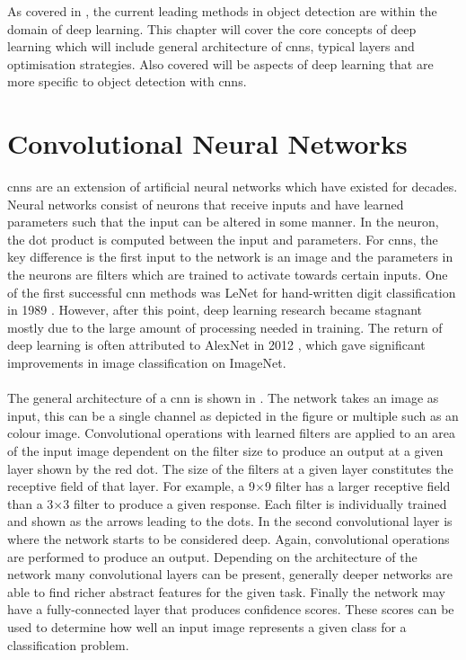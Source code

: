 As covered in , the current leading methods in object detection are within the domain of deep learning. This chapter will cover the core concepts of deep learning which will include general architecture of \glspl{cnn}, typical layers and optimisation strategies. Also covered will be aspects of deep learning that are more specific to object detection with \glspl{cnn}.

\section{Convolutional Neural Networks}
\glspl{cnn} are an extension of artificial neural networks which have existed for decades. Neural networks consist of neurons that receive inputs and have learned parameters such that the input can be altered in some manner. In the neuron, the dot product is computed between the input and parameters. For \glspl{cnn}, the key difference is the first input to the network is an image and the parameters in the neurons are filters which are trained to activate towards certain inputs. One of the first successful \gls{cnn} methods was LeNet for hand-written digit classification in 1989 \cite{lenet}. However, after this point, deep learning research became stagnant mostly due to the large amount of processing needed in training. The return of deep learning is often attributed to AlexNet in 2012 \cite{alexnet}, which gave significant improvements in image classification on ImageNet.
\\\\
The general architecture of a \gls{cnn} is shown in . The network takes an image as input, this can be a single channel as depicted in the figure or multiple such as an colour image. Convolutional operations with learned filters are applied to an area of the input image dependent on the filter size to produce an output at a given layer shown by the red dot. The size of the filters at a given layer constitutes the receptive field of that layer. For example, a 9$\times$9 filter has a larger receptive field than a 3$\times$3 filter to produce a given response. Each filter is individually trained and shown as the arrows leading to the dots. In the second convolutional layer is where the network starts to be considered deep. Again, convolutional operations are performed to produce an output. Depending on the architecture of the network many convolutional layers can be present, generally deeper networks are able to find richer abstract features for the given task. Finally the network may have a fully-connected layer that produces confidence scores. These scores can be used to determine how well an input image represents a given class for a classification problem.

